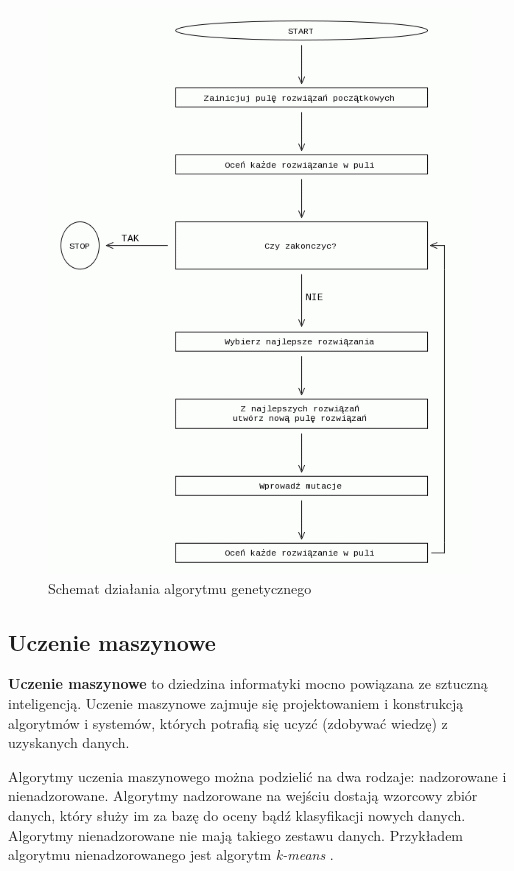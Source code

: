 \documentclass[twocolumn]{svjour3}          %
\begin{document}
\begin{figure}
    \includegraphics[scale=0.5]{obrazki/algorytm_genetyczny.png}
    \caption{Schemat działania algorytmu genetycznego}
    \label{fig:alg_gen}       %
\end{figure}

\subsection{Uczenie maszynowe}
\label{sub:uczenie_maszynowe}
\textbf{Uczenie maszynowe} to dziedzina informatyki mocno powiązana ze sztuczną inteligencją. Uczenie maszynowe zajmuje się projektowaniem i konstrukcją algorytmów i systemów, których potrafią się ucyzć (zdobywać wiedzę) z uzyskanych danych.

Algorytmy uczenia maszynowego można podzielić na dwa rodzaje: nadzorowane i nienadzorowane. Algorytmy nadzorowane na wejściu dostają wzorcowy zbiór danych, który służy im za bazę do oceny bądź klasyfikacji nowych danych. Algorytmy nienadzorowane nie mają takiego zestawu danych. Przykładem algorytmu nienadzorowanego jest algorytm \textit{k-means} \cite{sugar03}.
\end{document}
